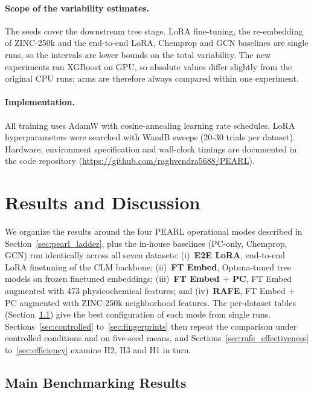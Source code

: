 \documentclass[pdflatex,sn-mathphys-num]{sn-jnl}%
\begin{document}
\paragraph{Scope of the variability estimates.} The seeds cover the downstream tree stage. LoRA fine-tuning, the re-embedding of ZINC-250k and the end-to-end LoRA, Chemprop and GCN baselines are single runs, so the intervals are lower bounds on the total variability. The new experiments ran XGBoost on GPU, so absolute values differ slightly from the original CPU runs; arms are therefore always compared within one experiment.

\paragraph{Implementation.} All training uses AdamW with cosine-annealing learning rate schedules. LoRA hyperparameters were searched with WandB sweeps ($20$-$30$ trials per dataset). Hardware, environment specification and wall-clock timings are documented in the code repository (\url{https://github.com/raghvendra5688/PEARL}).

\section{Results and Discussion}\label{sec:results_discussion}

We organize the results around the four PEARL operational modes described in Section~\ref{sec:pearl_ladder}, plus the in-house baselines (PC-only, Chemprop, GCN) run identically across all seven datasets: (i)~\textbf{E2E LoRA}, end-to-end LoRA finetuning of the CLM backbone; (ii)~\textbf{FT Embed}, Optuna-tuned tree models on frozen finetuned embeddings; (iii)~\textbf{FT Embed $+$ PC}, FT Embed augmented with 473 physicochemical features; and (iv)~\textbf{RAFE}, FT Embed $+$ PC augmented with ZINC-250k neighborhood features. The per-dataset tables (Section~\ref{sec:main_results}) give the best configuration of each mode from single runs. Sections~\ref{sec:controlled} to~\ref{sec:fingerprints} then repeat the comparison under controlled conditions and on five-seed means, and Sections~\ref{sec:rafe_effectiveness} to~\ref{sec:efficiency} examine H2, H3 and H1 in turn.

\subsection{Main Benchmarking Results}\label{sec:main_results}
\end{document}

